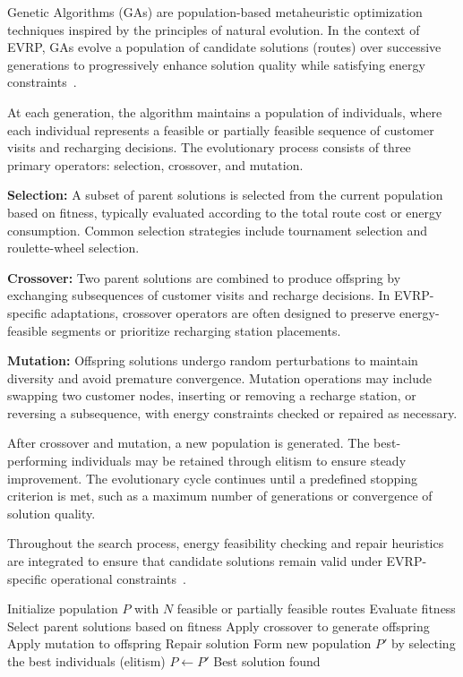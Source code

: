 Genetic Algorithms (GAs) are population-based metaheuristic optimization techniques inspired by the principles of natural evolution. In the context of EVRP, GAs evolve a population of candidate solutions (routes) over successive generations to progressively enhance solution quality while satisfying energy constraints~\cite{abdallah2020electric}.

At each generation, the algorithm maintains a population of individuals, where each individual represents a feasible or partially feasible sequence of customer visits and recharging decisions. The evolutionary process consists of three primary operators: selection, crossover, and mutation.

\textbf{Selection:} A subset of parent solutions is selected from the current population based on fitness, typically evaluated according to the total route cost or energy consumption. Common selection strategies include tournament selection and roulette-wheel selection.

\textbf{Crossover:} Two parent solutions are combined to produce offspring by exchanging subsequences of customer visits and recharge decisions. In EVRP-specific adaptations, crossover operators are often designed to preserve energy-feasible segments or prioritize recharging station placements.

\textbf{Mutation:} Offspring solutions undergo random perturbations to maintain diversity and avoid premature convergence. Mutation operations may include swapping two customer nodes, inserting or removing a recharge station, or reversing a subsequence, with energy constraints checked or repaired as necessary.

After crossover and mutation, a new population is generated. The best-performing individuals may be retained through elitism to ensure steady improvement. The evolutionary cycle continues until a predefined stopping criterion is met, such as a maximum number of generations or convergence of solution quality.

Throughout the search process, energy feasibility checking and repair heuristics are integrated to ensure that candidate solutions remain valid under EVRP-specific operational constraints~\cite{abdulaal2016solving}.

\begin{algorithm}[H]
\caption{Genetic Algorithm for EVRP}
\begin{algorithmic}[1]
\State Initialize population $P$ with $N$ feasible or partially feasible routes
        \State Evaluate fitness
    \EndFor
    \State Select parent solutions based on fitness
    \State Apply crossover to generate offspring
    \State Apply mutation to offspring
            \State Repair solution
        \EndIf
    \EndFor
    \State Form new population $P'$ by selecting the best individuals (elitism)
    \State $P \gets P'$
\EndWhile
\State \Return Best solution found
\end{algorithmic}
\end{algorithm}

